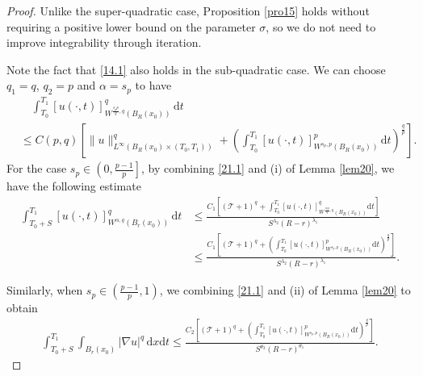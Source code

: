 \documentclass[reqno,10pt]{amsart}
\numberwithin{equation}{section}
\begin{document}
\begin{proof}
	Unlike the super-quadratic case, Proposition \ref{pro15} holds without requiring a positive lower bound on the parameter $\sigma$, so we do not need to improve integrability through iteration.
	
	Note the fact that \eqref{14.1} also holds in the sub-quadratic case. We can choose $q_1=q$, $q_2=p$ and $\alpha=s_p$ to have
	\begin{align}
		\label{21.1}
		&\quad\int_{T_0}^{T_1}[u(\cdot,t)]^{q}_{W^{\frac{s_p p}{q},q}(B_R(x_0))}\,\mathrm{d}t\nonumber\\
		&\le C(p,q)\left[\|u\|^q_{L^\infty\left(B_R(x_0)\times(T_0,T_1)\right)}+\left( \int_{T_0}^{T_1}[u(\cdot,t)]^{p}_{W^{s_p,p}(B_R(x_0))}\,\mathrm{d}t\right)^{\frac{q}{p}}\right].
	\end{align}
	For the case $s_p\in\left( 0,\frac{p-1}{p}\right]$, by combining \eqref{21.1} and (i) of Lemma \ref{lem20}, we have the following estimate
	\begin{align*}
		\int_{T_0+S}^{T_1}[u(\cdot,t)]^q_{W^{\alpha,q}(B_r(x_0))}\,\mathrm{d}t&\le\frac{C_1\left[\left(\mathcal{T}+1\right)^q+\int_{T_0}^{T_1}[u(\cdot,t)]^q_{W^{\frac{s_p p}{q},q}\left( B_R(x_0)\right)}\mathrm{d}t \right]}{S^{\lambda_2}(R-r)^{\lambda_1}}\\
		&\le\frac{C_1\left[\left(\mathcal{T}+1\right)^q+\left( \int_{T_0}^{T_1}[u(\cdot,t)]^p_{W^{s_p,p}\left( B_R(x_0)\right)}\mathrm{d}t\right)^{\frac{q}{p}} \right]}{S^{\lambda_2}(R-r)^{\lambda_1}}.
	\end{align*}
	
	Similarly, when $s_p\in\left( \frac{p-1}{p},1\right)$, we combining \eqref{21.1} and (ii) of Lemma \ref{lem20} to obtain
	\begin{align*}
		\int_{T_0+S}^{T_1}\int_{B_r(x_0)}|\nabla u|^q\,\mathrm{d}x\mathrm{d}t\le\frac{C_2\left[\left(\mathcal{T}+1\right)^q+\left( \int_{T_0}^{T_1}[u(\cdot,t)]^p_{W^{s_p,p}\left( B_R(x_0)\right)}\mathrm{d}t\right)^{\frac{q}{p}} \right]}{S^{\theta_2}(R-r)^{\theta_1}}.
	\end{align*}
\end{proof}
\end{document}
